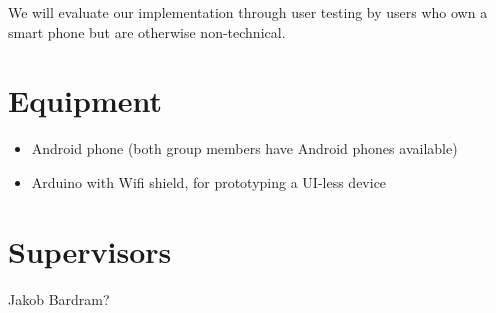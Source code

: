 \documentclass{ubicomp2011}
\begin{document}
We will evaluate our implementation through user testing by users who own a smart phone but are otherwise non-technical.

\section{Equipment}
\begin{itemize}
\item Android phone (both group members have Android phones available)
\item Arduino with Wifi shield, for prototyping a UI-less device
\end{itemize}


\section{Supervisors}
Jakob Bardram?






\end{document}

